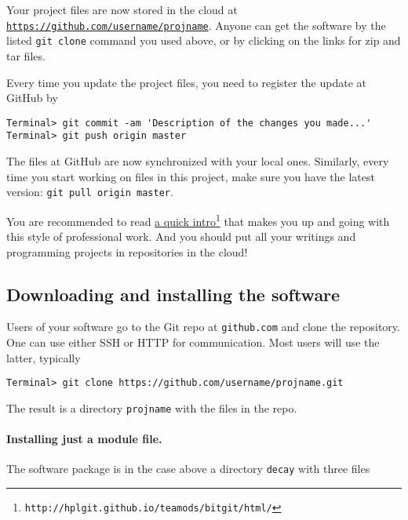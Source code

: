 \documentclass[graybox,sectrefs,envcountresetchap,open=right,final]{svmonodo}
\begin{document}
Your project files are now stored in the cloud at
\href{{https://github.com/username/projname}}{\nolinkurl{https://github.com/username/projname}}. Anyone can
get the software by the listed \texttt{git clone} command you used above,
or by clicking on the links for zip and tar files.

Every time you update the project files, you need to register
the update at GitHub by




\begin{Verbatim}[frame=lines,label=\fbox{{\tiny Terminal}},framesep=2.5mm,framerule=0.7pt,fontsize=\fontsize{9pt}{9pt}]
Terminal> git commit -am 'Description of the changes you made...'
Terminal> git push origin master

\end{Verbatim}

The files at GitHub are now synchronized with your local ones.
Similarly, every time you start working on files in this project,
make sure you have the latest version:
\texttt{git pull origin master}.

You are recommended to read \href{{http://hplgit.github.io/teamods/bitgit/html/}}{a quick intro}\footnote{\texttt{http://hplgit.github.io/teamods/bitgit/html/}} that makes you
up and going with this style of
professional work. And you should put all your writings and programming
projects in repositories in the cloud!

\subsection{Downloading and installing the software}

Users of your software go to the Git repo at \texttt{github.com} and
clone the repository. One can use either SSH or HTTP for communication.
Most users will use the latter, typically



\begin{Verbatim}[frame=lines,label=\fbox{{\tiny Terminal}},framesep=2.5mm,framerule=0.7pt,fontsize=\fontsize{9pt}{9pt}]
Terminal> git clone https://github.com/username/projname.git

\end{Verbatim}

The result is a directory \texttt{projname} with the files in the repo.

\paragraph{Installing just a module file.}
The software package is in the case above a directory \texttt{decay} with three files
\end{document}
